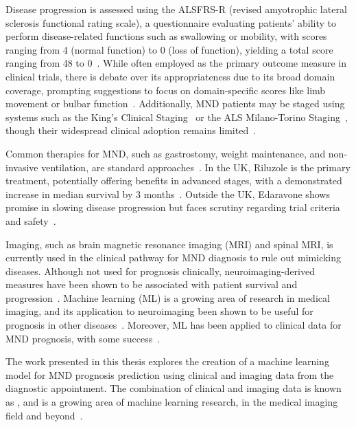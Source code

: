 Disease progression is assessed using the ALSFRS-R (revised amyotrophic lateral sclerosis functional rating scale), a questionnaire evaluating patients' ability to perform disease-related functions such as swallowing or mobility, with scores ranging from 4 (normal function) to 0 (loss of function), yielding a total score ranging from 48 to 0~\cite{cedarbaumALSFRSRRevisedALS1999}.
While often employed as the primary outcome measure in clinical trials, there is debate over its appropriateness due to its broad domain coverage, prompting suggestions to focus on domain-specific scores like limb movement or bulbar function~\cite{vaneijkOldFriendWho2021, rooneyWhatDoesALSFRSR2017}.
Additionally, MND patients may be staged using systems such as the King's Clinical Staging~\cite{rocheProposedStagingSystem2012} or the ALS Milano-Torino Staging~\cite{chioDevelopmentEvaluationClinical2015}, though their widespread clinical adoption remains limited~\cite{feldmanAmyotrophicLateralSclerosis2022, fangComparisonKingMiToS2017}.

Common therapies for MND, such as gastrostomy, weight maintenance, and non-invasive ventilation, are standard approaches~\cite{bourkeEffectsNoninvasiveVentilation2006}.
In the UK, Riluzole is the primary treatment, potentially offering benefits in advanced stages, with a demonstrated increase in median survival by 3 months~\cite{millerRiluzoleAmyotrophicLateral2012, hinchcliffeRiluzoleRealworldEvidence2017}.
Outside the UK, Edaravone shows promise in slowing disease progression but faces scrutiny regarding trial criteria and safety~\cite{witzelSafetyEffectivenessLongterm2022}.


Imaging, such as brain magnetic resonance imaging (MRI) and spinal MRI, is currently used in the clinical pathway for MND diagnosis to rule out mimicking diseases.
Although not used for prognosis clinically, neuroimaging-derived measures have been shown to be associated with patient survival and progression~\cite{mullerLargescaleMulticentreCerebral2016,agostaMRIPredictorsLongterm2010}.
Machine learning (ML) is a growing area of research in medical imaging, and its application to neuroimaging been shown to be useful for prognosis in other diseases~\cite{gerratyMachineLearningParkinson2023}.
Moreover, ML has been applied to clinical data for MND prognosis, with some success~\cite{grollemundMachineLearningAmyotrophic2019, papaizMachineLearningSolutions2022}.

The work presented in this thesis explores the creation of a machine learning model for MND prognosis prediction using clinical and imaging data from the diagnostic appointment.
The combination of clinical and imaging data is known as , and is a growing area of machine learning research, in the medical imaging field and beyond~\cite{cuiDeepMultimodalFusion2022, mohsenArtificialIntelligencebasedMethods2022}.


